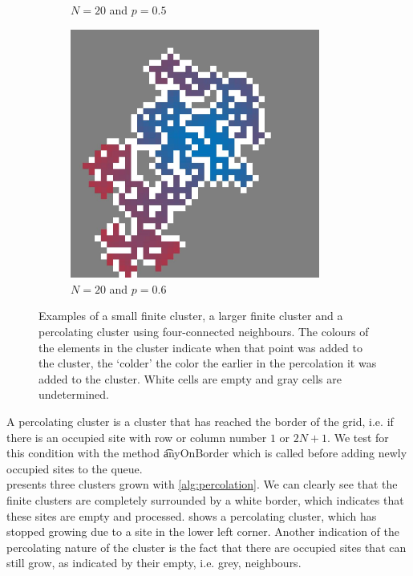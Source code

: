 \begin{figure}
\begin{subfigure}{0.27\textwidth}
		\caption{$N = 20$ and $p = 0.5$}
		\label{fig:method:fin_inf:finiteLarge}
	\end{subfigure}	
	\begin{subfigure}{0.27\textwidth}
		\centering
		\includegraphics[width=0.9\textwidth]{./img/fancy_cluster_N20_p6_rng_5}
		\caption{$N = 20$ and $p = 0.6$}
		\label{fig:method:fin_inf:infinite}
	\end{subfigure}		
	\caption{Examples of  a small finite cluster,  a larger finite cluster and  a percolating cluster using four-connected neighbours. The colours of the elements in the cluster indicate when that point was added to the cluster, the `colder' the color the earlier in the percolation it was added to the cluster. White cells are empty and gray cells are undetermined. }
	\label{fig:method:fin_inf}
\end{figure}


A percolating cluster is a cluster that has reached the border of the grid, i.e. if there is an occupied site with row or column number $1$ or $2N + 1$. We test for this condition with the method \t{anyOnBorder} which is called before adding newly occupied sites to the queue.\\

 presents three clusters grown with \cref{alg:percolation}. We can clearly see that the finite clusters are completely surrounded by a white border, which indicates that these sites are empty and processed.  shows a percolating cluster, which has stopped growing due to a site in the lower left corner.
Another indication of the percolating nature of the cluster is the fact that there are occupied sites that can still grow, as indicated by their empty, i.e. grey, neighbours.

